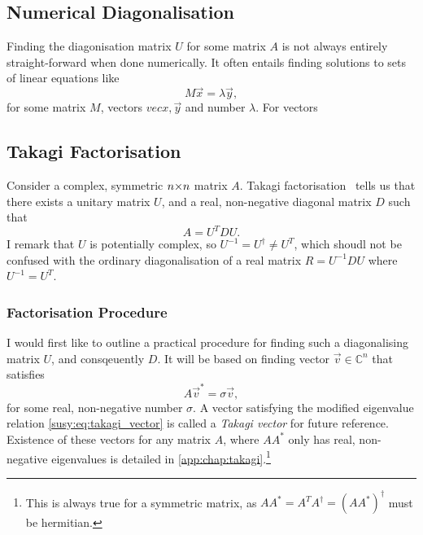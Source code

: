\documentclass[../main.tex]{subfiles}
\begin{document}
\subsection{Numerical Diagonalisation}
Finding the diagonisation matrix \(U\) for some matrix \(A\) is not always entirely straight-forward when done numerically.
It often entails finding solutions to sets of linear equations like
\begin{equation}
  M \vec{x} = \lambda \vec{y},
\end{equation}
for some matrix \(M\), vectors \(vec{x}, \vec{y}\) and number \(\lambda\).
For vectors

\subsection{Takagi Factorisation}
Consider a complex, symmetric \(n{\times} n\) matrix \(A\).
Takagi factorisation~\cite{Horn} tells us that there exists a unitary matrix \(U\), and a real, non-negative diagonal matrix \(D\) such that
\begin{equation}
  \label{susy:eq:takagi}
  A = U^T D U.
\end{equation}
I remark that \(U\) is potentially complex, so \(U^{-1} = U^\dagger \neq U^T\), which shoudl not be confused with the ordinary diagonalisation of a real matrix \(R = U^{-1} D U\) where \(U^{-1} = U^T\).


\subsubsection*{Factorisation Procedure}
I would first like to outline a practical procedure for finding such a diagonalising matrix \(U\), and consqeuently \(D\).
It will be based on finding vector \(\vec{v} \in  \mathbb{C}^n\) that satisfies
\begin{equation}
  \label{susy:eq:takagi_vector}
  A \vec{v}^* = \sigma \vec{v},
\end{equation}
for some real, non-negative number \(\sigma\).
A vector satisfying the modified eigenvalue relation \cref{susy:eq:takagi_vector} is called a \emph{Takagi vector} for future reference.
Existence of these vectors for any matrix \(A\), where \(AA^\ast\) only has real, non-negative eigenvalues is detailed in \cref{app:chap:takagi}.\footnote{This is always true for a symmetric matrix, as \(AA^\ast = A^T A^\dagger = (AA^\ast)^\dagger\) must be hermitian.}
\end{document}

